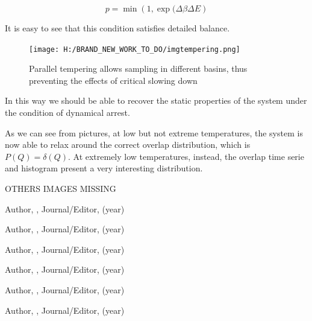 \documentclass{article}
\begin{document}
\begin{equation}
p = \min ( 1, { \exp(  \Delta \beta \Delta E   } ) 
\end{equation}

It is easy to see that this condition satisfies detailed balance.

\begin{figure}
		\texttt{[image: H:/BRAND\_NEW\_WORK\_TO\_DO/imgtempering.png]}
	\label{fig:imgtempering}
	\caption{Parallel tempering allows sampling in different basins, thus preventing the effects of critical slowing down}
\end{figure}


In this way we should be able to recover the static properties of the system under the condition of dynamical arrest.

As we can see from pictures, at low but not extreme temperatures, the system is now able to relax around the correct overlap distribution, which is $P(Q) = \delta(Q)$. At extremely low temperatures, instead, the overlap time serie and histogram present a very interesting distribution.


OTHERS IMAGES MISSING

{\newpage}

\begin{thebibliography}{99}

  {}Author, {}, Journal/Editor, (year)

  {}Author, {}, Journal/Editor, (year)

  {}Author, {}, Journal/Editor, (year)

  {}Author, {}, Journal/Editor, (year)

  {}Author, {}, Journal/Editor, (year)

  {}Author, {}, Journal/Editor, (year)
\end{thebibliography}
\end{document}

